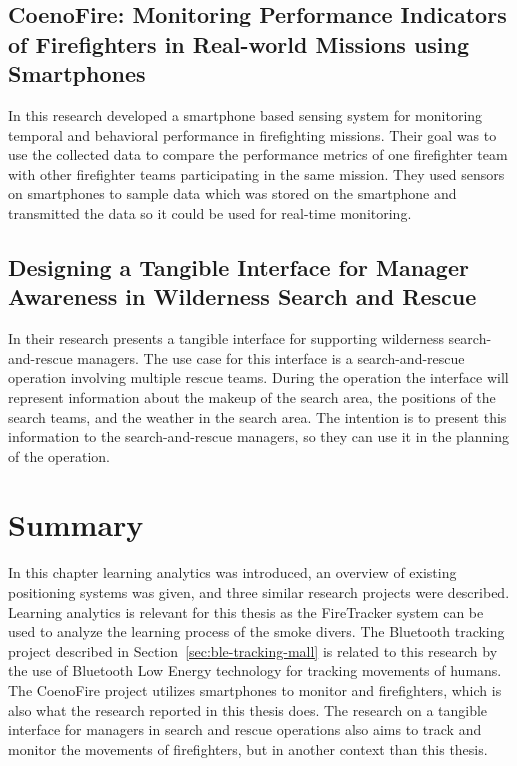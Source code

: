\documentclass[../Main/thesis.tex]{subfiles}
\begin{document}
\subsection{CoenoFire: Monitoring Performance Indicators of Firefighters in Real-world Missions using Smartphones}
In this research \citet{Feese2013} developed a smartphone based sensing system for monitoring temporal and behavioral performance in firefighting missions.
Their goal was to use the collected data to compare the performance metrics of one firefighter team with other firefighter teams participating in the same mission.
They used sensors on smartphones to sample data which was stored on the smartphone and transmitted the data so it could be used for real-time monitoring.

\subsection{Designing a Tangible Interface for Manager Awareness in Wilderness Search and Rescue}
In their research \citet{Jones2018} presents a tangible interface for supporting wilderness search-and-rescue managers.
The use case for this interface is a search-and-rescue operation involving multiple rescue teams. 
During the operation the interface will represent information about the makeup of the search area, the positions of the search teams, and the weather in the search area.
The intention is to present this information to the search-and-rescue managers, so they can use it in the planning of the operation.

\section{Summary}
In this chapter learning analytics was introduced, an overview of existing positioning systems was given, and three similar research projects were described.
Learning analytics is relevant for this thesis as the FireTracker system can be used to analyze the learning process of the smoke divers.
The Bluetooth tracking project described in Section~\ref{sec:ble-tracking-mall} is related to this research by the use of Bluetooth Low Energy technology for tracking movements of humans.
The CoenoFire project utilizes smartphones to monitor and firefighters, which is also what the research reported in this thesis does.
The research on a tangible interface for managers in search and rescue operations also aims to track and monitor the movements of firefighters, but in another context than this thesis.
\end{document}
